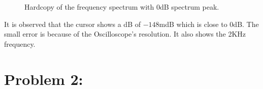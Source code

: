 \begin{enumerate}
\begin{figure}[H]
              \caption{Hardcopy of the frequency spectrum with 0dB spectrum peak.}
              \label{fig:problem1_hardcopy5}
          \end{figure}
          It is observed that the cursor shows a dB of $-148$mdB which is close to $0$dB. The small error is because of the Oscilloscope's resolution. It also shows the 2KHz frequency.
\end{enumerate}

\section{Problem 2:}